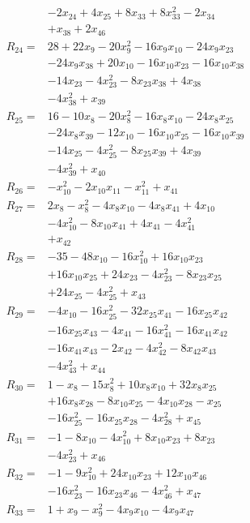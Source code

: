 \begin{align*}
&-2x_{24} +4x_{25} +8x_{33} +8x_{33}^{2} -2x_{34}\\
&+x_{38} +2x_{46}\\[3pt]
R_{24}={}&28 +22x_{9} -20x_{9}^{2} -16x_{9}x_{10} -24x_{9}x_{23}\\
&-24x_{9}x_{38} +20x_{10} -16x_{10}x_{23} -16x_{10}x_{38}\\
&-14x_{23} -4x_{23}^{2} -8x_{23}x_{38} +4x_{38}\\
&-4x_{38}^{2} +x_{39}\\[3pt]
R_{25}={}&16 -10x_{8} -20x_{8}^{2} -16x_{8}x_{10} -24x_{8}x_{25}\\
&-24x_{8}x_{39} -12x_{10} -16x_{10}x_{25} -16x_{10}x_{39}\\
&-14x_{25} -4x_{25}^{2} -8x_{25}x_{39} +4x_{39}\\
&-4x_{39}^{2} +x_{40}\\[3pt]
R_{26}={}&-x_{10}^{2} -2x_{10}x_{11} -x_{11}^{2} +x_{41}\\[3pt]
R_{27}={}&2x_{8} -x_{8}^{2} -4x_{8}x_{10} -4x_{8}x_{41} +4x_{10}\\
&-4x_{10}^{2} -8x_{10}x_{41} +4x_{41} -4x_{41}^{2}\\
&+x_{42}\\[3pt]
R_{28}={}&-35 -48x_{10} -16x_{10}^{2} +16x_{10}x_{23}\\
&+16x_{10}x_{25} +24x_{23} -4x_{23}^{2} -8x_{23}x_{25}\\
&+24x_{25} -4x_{25}^{2} +x_{43}\\[3pt]
R_{29}={}&-4x_{10} -16x_{25}^{2} -32x_{25}x_{41} -16x_{25}x_{42}\\
&-16x_{25}x_{43} -4x_{41} -16x_{41}^{2} -16x_{41}x_{42}\\
&-16x_{41}x_{43} -2x_{42} -4x_{42}^{2} -8x_{42}x_{43}\\
&-4x_{43}^{2} +x_{44}\\[3pt]
R_{30}={}&1 -x_{8} -15x_{8}^{2} +10x_{8}x_{10} +32x_{8}x_{25}\\
&+16x_{8}x_{28} -8x_{10}x_{25} -4x_{10}x_{28} -x_{25}\\
&-16x_{25}^{2} -16x_{25}x_{28} -4x_{28}^{2} +x_{45}\\[3pt]
R_{31}={}&-1 -8x_{10} -4x_{10}^{2} +8x_{10}x_{23} +8x_{23}\\
&-4x_{23}^{2} +x_{46}\\[3pt]
R_{32}={}&-1 -9x_{10}^{2} +24x_{10}x_{23} +12x_{10}x_{46}\\
&-16x_{23}^{2} -16x_{23}x_{46} -4x_{46}^{2} +x_{47}\\[3pt]
R_{33}={}&1 +x_{9} -x_{9}^{2} -4x_{9}x_{10} -4x_{9}x_{47}\\

\end{align*}
